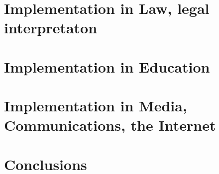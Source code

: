 \documentclass[
]{book}
\begin{document}
\hypertarget{implementation-in-law-legal-interpretaton}{%
\chapter{Implementation in Law, legal interpretaton}\label{implementation-in-law-legal-interpretaton}}

\hypertarget{implementation-in-education}{%
\chapter{Implementation in Education}\label{implementation-in-education}}

\hypertarget{implementation-in-media-communications-the-internet}{%
\chapter{Implementation in Media, Communications, the Internet}\label{implementation-in-media-communications-the-internet}}

\hypertarget{conclusions}{%
\chapter{Conclusions}\label{conclusions}}
\end{document}

